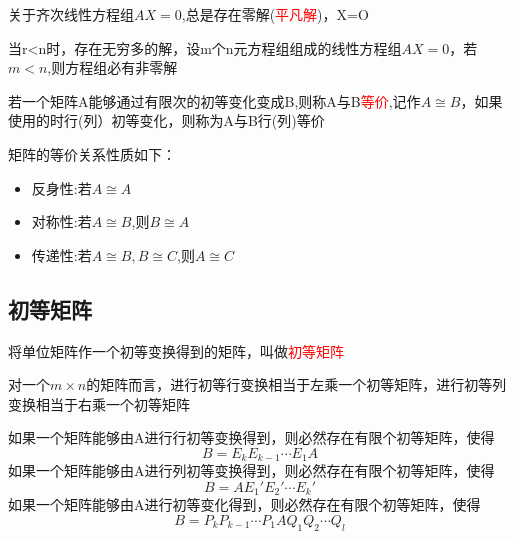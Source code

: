 
关于齐次线性方程组$AX=0$,总是存在零解(\textcolor{red}{平凡解})，X=O


当r<n时，存在无穷多的解，设m个n元方程组组成的线性方程组$AX=0$，若$m<n$,则方程组必有非零解


若一个矩阵A能够通过有限次的初等变化变成B,则称A与B\textcolor{red}{等价},记作$A\cong B$，如果使用的时行(列）初等变化，则称为A与B行(列)等价

矩阵的等价关系性质如下：
\begin{theorem}
    \begin{itemize}
        \item {反身性:若$A\cong A$}
        \item {对称性:若$A\cong B$,则$B\cong A$}
        \item {传递性:若$A\cong B,B\cong C$,则$A\cong C$}
    \end{itemize}
\end{theorem}

\subsection{初等矩阵}
\begin{definition}

将单位矩阵作一个初等变换得到的矩阵，叫做\textcolor{red}{初等矩阵}
\end{definition}

对一个$m\times n$的矩阵而言，进行初等行变换相当于左乘一个初等矩阵，进行初等列变换相当于右乘一个初等矩阵

\begin{note}
    如果一个矩阵能够由A进行行初等变换得到，则必然存在有限个初等矩阵，使得
$$
B=E_kE_{k-1}\cdots E_1A
$$
如果一个矩阵能够由A进行列初等变换得到，则必然存在有限个初等矩阵，使得
$$
B=AE_1'E_2'\cdots E_k'
$$
如果一个矩阵能够由A进行初等变化得到，则必然存在有限个初等矩阵，使得
$$
B=P_kP_{k-1}\cdots P_1 A Q_1Q_2\cdots Q_l
$$
\end{note}
